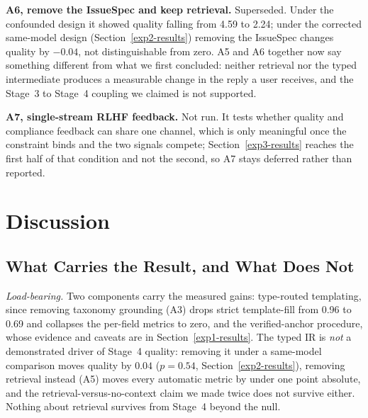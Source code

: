 \documentclass[preprint,12pt]{elsarticle}
\begin{document}
  \textbf{A6, remove the IssueSpec and keep retrieval.} Superseded. Under the confounded design
  it showed quality falling from 4.59 to 2.24; under the corrected same-model design
  (Section~\ref{exp2-results}) removing the IssueSpec changes quality by $-0.04$, not
  distinguishable from zero. A5 and A6 together now say something different from what we first
  concluded: neither retrieval nor the typed intermediate produces a measurable change in the
  reply a user receives, and the Stage~3 to Stage~4 coupling we claimed is not supported.

  \textbf{A7, single-stream RLHF feedback.} Not run. It tests whether quality and compliance
  feedback can share one channel, which is only meaningful once the constraint binds and the two
  signals compete; Section~\ref{exp3-results} reaches the first half of that condition and not the
  second, so A7 stays deferred rather than reported.

\section{Discussion}\label{discussion}

\subsection{What Carries the Result, and What Does Not}\label{load-bearing}

\emph{Load-bearing.} Two components carry the measured gains: type-routed templating, since
removing taxonomy grounding (A3) drops strict template-fill from 0.96 to 0.69 and collapses the
per-field metrics to zero, and the verified-anchor procedure, whose evidence and caveats are in
Section~\ref{exp1-results}. The typed IR is \emph{not} a demonstrated driver of Stage~4 quality:
removing it under a same-model comparison moves quality by $0.04$ ($p = 0.54$,
Section~\ref{exp2-results}), removing retrieval instead (A5) moves every automatic metric by under
one point absolute, and the retrieval-versus-no-context claim we made twice does not survive
either. Nothing about retrieval survives from Stage~4 beyond the null.
\end{document}
